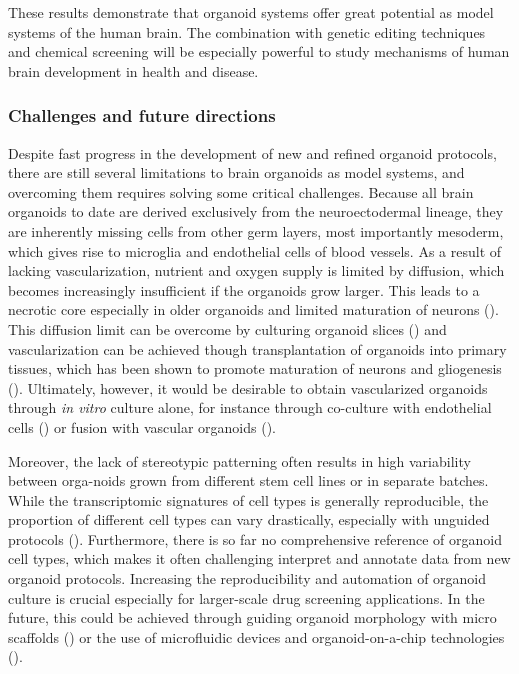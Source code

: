 These results demonstrate that organoid systems offer great potential as model systems of the human brain. The combination with genetic editing techniques and chemical screening will be especially powerful to study mechanisms of human brain development in health and disease.

\subsubsection{Challenges and future directions}

Despite fast progress in the development of new and refined organoid protocols, there are still several limitations to brain organoids as model systems, and overcoming them requires solving some critical challenges. Because all brain organoids to date are derived exclusively from the neuroectodermal lineage, they are inherently missing cells from other germ layers, most importantly mesoderm, which gives rise to microglia and endothelial cells of blood vessels. As a result of lacking vascularization, nutrient and oxygen supply is limited by diffusion, which becomes increasingly insufficient if the organoids grow larger. This leads to a necrotic core especially in older organoids and limited maturation of neurons (\cite{vertesy_cellular_2022,bhaduri_cell_2020}). This diffusion limit can be overcome by culturing organoid slices (\cite{qian_sliced_2020}) and vascularization can be achieved though transplantation of organoids into primary tissues, which has been shown to promote maturation of neurons and gliogenesis (\cite{mansour_vivo_2018}). Ultimately, however, it would be desirable to obtain vascularized organoids through \textit{in vitro} culture alone, for instance through co-culture with endothelial cells (\cite{takebe_vascularized_2015}) or fusion with vascular organoids (\cite{wimmer_human_2019}). 

Moreover, the lack of stereotypic patterning often results in high variability between orga-noids grown from different stem cell lines or in separate batches. While the transcriptomic signatures of cell types is generally reproducible, the proportion of different cell types can vary drastically, especially with unguided protocols (\cite{kanton_organoid_2019}). Furthermore, there is so far no comprehensive reference of organoid cell types, which makes it often challenging interpret and annotate data from new organoid protocols. Increasing the reproducibility and automation of organoid culture is crucial especially for larger-scale drug screening applications. In the future, this could be achieved through guiding organoid morphology with micro scaffolds (\cite{lancaster_guided_2017}) or the use of microfluidic devices and organoid-on-a-chip technologies (\cite{park_organoids---chip_2019}).





